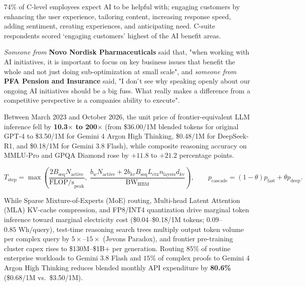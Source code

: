 \documentclass{article}
\newcounter{subsubsubsection}[subsubsection]
\begin{document}
\vspace{0.2cm}

\hspace{-0.675cm} 74\% of C-level employees expect AI to be helpful with; engaging customers by enhancing the user experience, tailoring content, increasing response speed, adding sentiment, creating experiences, and anticipating need. C-suite respondents scored ‘engaging customers’ highest of the AI benefit areas.

\vspace{0.2cm}

\hspace{-0.675cm} \textit{Someone from} \textbf{Novo Nordisk Pharmaceuticals} said that, "when working with AI initiatives, it is important to focus on key business issues that benefit the whole and not just doing sub-optimization at small scale", and \textit{someone from} \textbf{PFA Pension and Insurance} said, "I don ́t see why speaking openly about our ongoing AI initiatives should be a big fuss. What really makes a difference from a competitive perspective is a companies ability to execute".

\vspace{0.35cm}


Between March 2023 and October 2026, the unit price of frontier-equivalent LLM inference fell by \textbf{10.3$\times$ to 200$\times$} (from \$36.00/1M blended tokens for original GPT-4 to \$3.50/1M for Gemini 4 Argon High Thinking, \$0.48/1M for DeepSeek-R1, and \$0.18/1M for Gemini 3.8 Flash), while composite reasoning accuracy on MMLU-Pro and GPQA Diamond rose by $+11.8$ to $+21.2$ percentage points.

\begin{equation}
  T_{\text{step}} = \max\left( \frac{2 B_{\text{seq}} N_{\text{active}}}{\text{FLOP/s}_{\text{peak}}}, \; \frac{b_w N_{\text{active}} + 2 b_{kv} B_{\text{seq}} L_{\text{ctx}} n_{\text{layers}} d_{kv}}{\text{BW}_{\text{HBM}}} \right), \qquad p_{\text{cascade}} = (1 - \theta) p_{\text{fast}} + \theta p_{\text{deep}}.
\end{equation}

While Sparse Mixture-of-Experts (MoE) routing, Multi-head Latent Attention (MLA) KV-cache compression, and FP8/INT4 quantization drive marginal token inference toward marginal electricity cost (\$0.04--\$0.18/1M tokens; $0.09$--$0.85\text{ Wh/query}$), test-time reasoning search trees multiply output token volume per complex query by $5\times$--$15\times$ (Jevons Paradox), and frontier pre-training cluster capex rises to \$130M--\$1B+ per generation. Routing $85\%$ of routine enterprise workloads to Gemini 3.8 Flash and $15\%$ of complex proofs to Gemini 4 Argon High Thinking reduces blended monthly API expenditure by \textbf{80.6\%} (\$0.68/1M vs.\ \$3.50/1M).
\end{document}
